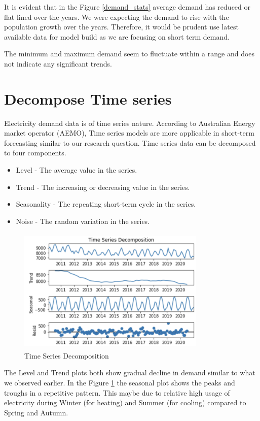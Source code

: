 \documentclass[mstat,12pt]{unswthesis}
\begin{document}
It is evident that in the Figure \ref{demand_stats} average demand has
reduced or flat lined over the years. We were expecting the demand to
rise with the population growth over the years. Therefore, it would be
prudent use latest available data for model build as we are focusing on
short term demand.

The minimum and maximum demand seem to fluctuate within a range and does
not indicate any significant trends.

\section{Decompose Time series}\label{decompose-time-series}

Electricity demand data is of time series nature. According to
Australian Energy market operator (AEMO), Time series models are more
applicable in short-term forecasting \cite{aemo2023forecasting} similar
to our research question. Time series data can be decomposed to four
components. \cite{brownlee_2017_how}

\begin{itemize}
  \item Level - The average value in the series.
  \item Trend - The increasing or decreasing value in the series.
  \item Seasonality - The repeating short-term cycle in the series.
  \item Noise - The random variation in the series.
\end{itemize}

\begin{figure}[H]
\centering
\includegraphics[width=0.80\textwidth,height=6cm]{time_series_conversion.png}
\caption{Time Series Decomposition}
\label{time_series_conversion}
\end{figure}

The Level and Trend plots both show gradual decline in demand similar to
what we observed earlier. In the Figure \ref{time_series_conversion} the
seasonal plot shows the peaks and troughs in a repetitive pattern. This
maybe due to relative high usage of electricity during Winter (for
heating) and Summer (for cooling) compared to Spring and Autumn.
\end{document}
